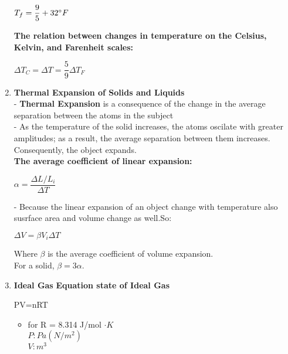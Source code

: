 \documentclass[10pt]{article}
\begin{document}
\begin{enumerate}
	\begin{mybox}
	\begin{center}
	$T_f = \dfrac{9}{5} + 32 \degree F$
	\end{center}
	\end{mybox}
	\textbf{The relation between changes in temperature on the Celsius, Kelvin, and Farenheit scales:}
	\begin{mybox}
	\begin{center}
	$\Delta T_C = \Delta T = \dfrac{5}{9} \Delta T_F$
	\end{center}
	\end{mybox}
	\item \textbf{Thermal Expansion of Solids and Liquids}\\
	- \textbf{Thermal Expansion} is a consequence of the change in the average separation between the atoms in the subject\\ 
	- As the temperature of the solid increases, the atoms oscilate with greater amplitudes; as a result, the average separation between them increases. Consequently, the object expands.\\
	\textbf{The average coefficient of linear expansion:}
	\begin{mybox}
	\begin{center}
	$\alpha = \dfrac{\Delta L / L_i}{\Delta T}$
	\end{center}
	\end{mybox}
	\pagebreak
	- Because the linear expansion of an object change with temperature also susrface area and volume change as well.So:
	\begin{mybox}
	\begin{center}
	$\Delta V = \beta V_i \Delta T$
	\end{center}
	\end{mybox}
	Where $\beta$ is the average coefficient of volume expansion.\\
	For a solid, $\beta = 3 \alpha$.
	\item \textbf{Ideal Gas}
	\textbf{Equation state of Ideal Gas}
	\begin{mybox}
	\begin{center}
	PV=nRT
	\end{center}
	\end{mybox}
	\begin{itemize}
	\item for R = 8.314 J/mol $\cdot K$\\
	 	$P:Pa(N/m^2)$\\
	 	$V:m^3$\\

\end{itemize}
\end{enumerate}
\end{document}
